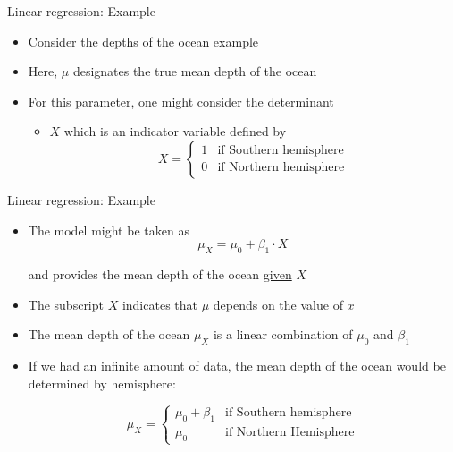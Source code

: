 \documentclass[10pt]{beamer}\usepackage[]{graphicx}\usepackage[]{color}
\begin{document}
\begin{frame}{Linear regression: Example}
	
	\begin{itemize}
		\setlength\itemsep{2em}
		\item Consider the depths of the ocean example
		\item Here, $\mu$ designates the true mean depth of the ocean 
		\item For this parameter, one might consider the determinant 
		\begin{itemize}
			\item $X$ which is an indicator variable defined by			
			$$
			X = \begin{cases}
			1 & \textrm{if Southern hemisphere}\\
			0 & \textrm{if Northern hemisphere}
			\end{cases}
			$$
			
		\end{itemize} 
		
	\end{itemize}
	
\end{frame}



\begin{frame}{Linear regression: Example}
	
	\begin{itemize}
		\setlength\itemsep{1.7em}
		\item The model might be taken as 
		$$
		\mu_X = \mu_0 + \beta_1 \cdot X 
		$$
		
		and provides the mean depth of the ocean \underline{given} $X$ 
		
		\item The subscript $X$ indicates that $\mu$ depends on the value of $x$
		
		\item The mean depth of the ocean $\mu_X$ is a linear combination of $\mu_0$ and $\beta_1$ 
		
			
		\item If we had an infinite amount of data, the mean depth of the ocean would be determined by hemisphere:
		
		$$
		\mu_X = \begin{cases}
		\mu_0 + \beta_1  &  \textrm{if Southern hemisphere}\\
		\mu_0  &  \textrm{if Northern Hemisphere}
		\end{cases}
		$$
		
	\end{itemize}
	
\end{frame}
\end{document}
